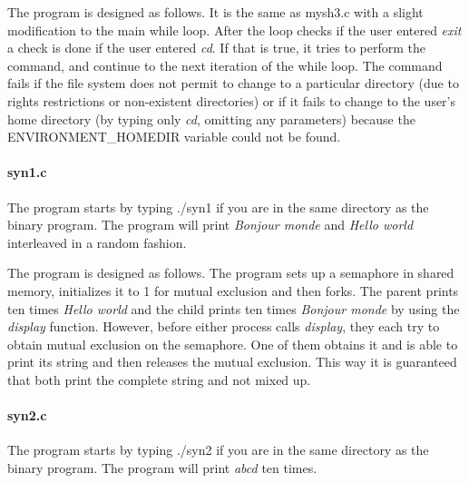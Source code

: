 \documentclass[a4paper,10pt]{article}
\begin{document}
The program is designed as follows. It is the same as mysh3.c with a slight modification to the main while loop. After the loop checks if the user entered \emph{exit} a check is done if the user entered \emph{cd}. If that is true, it tries to perform the command, and continue to the next iteration of the while loop. The command fails if the file system does not permit to change to a particular directory (due to rights restrictions or non-existent directories) or if it fails to change to the user's home directory (by typing only \emph{cd}, omitting any parameters) because the ENVIRONMENT\_HOMEDIR variable could not be found.

\paragraph{syn1.c} The program starts by typing ./syn1 if you are in the same directory as the binary program. The program will print \emph{Bonjour monde} and \emph{Hello world} interleaved in a random fashion.

The program is designed as follows. The program sets up a semaphore in shared memory, initializes it to 1 for mutual exclusion and then forks. The parent prints ten times \emph{Hello world} and the child prints ten times \emph{Bonjour monde} by using the \emph{display} function. However, before either process calls \emph{display}, they each try to obtain mutual exclusion on the semaphore. One of them obtains it and is able to print its string and then releases the mutual exclusion. This way it is guaranteed that both print the complete string and not mixed up.

\paragraph{syn2.c} The program starts by typing ./syn2 if you are in the same directory as the binary program. The program will print \emph{abcd} ten times.
\end{document}
